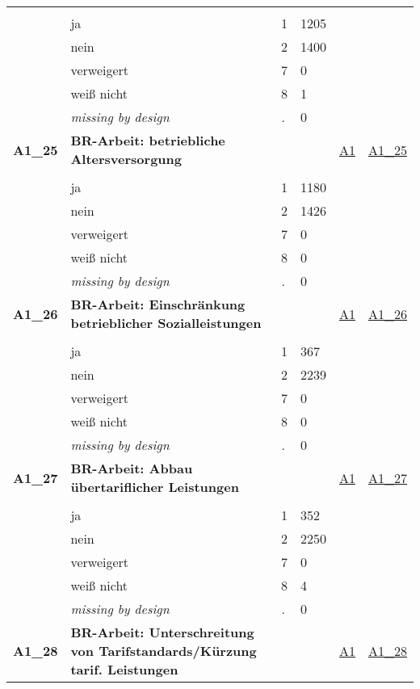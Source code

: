 \begin{longtable}{| L{2.45cm} | L{6cm} | C{1.5cm} | R{1cm} | C{2.25cm} | C{2.25cm} |}
   &  &  &  &  &  \\ 
   & ja & 1 & 1205 &  &  \\ 
   & nein & 2 & 1400 &  &  \\ 
   & verweigert & 7 & 0 &  &  \\ 
   & weiß nicht & 8 & 1 &  &  \\ 
   & \textit{missing by design} & \textit{.} & 0 &  &  \\ 
   \midrule
\textbf{A1\_25}\label{var:A1:25} & \textbf{BR-Arbeit: betriebliche Altersversorgung} &  &  & \hyperref[A1]{A1} & \hyperref[var:suf:A1:25]{A1\_25} \\ 
   &  &  &  &  &  \\ 
   & ja & 1 & 1180 &  &  \\ 
   & nein & 2 & 1426 &  &  \\ 
   & verweigert & 7 & 0 &  &  \\ 
   & weiß nicht & 8 & 0 &  &  \\ 
   & \textit{missing by design} & \textit{.} & 0 &  &  \\ 
   \midrule
\textbf{A1\_26}\label{var:A1:26} & \textbf{BR-Arbeit: Einschränkung betrieblicher Sozialleistungen} &  &  & \hyperref[A1]{A1} & \hyperref[var:suf:A1:26]{A1\_26} \\ 
   &  &  &  &  &  \\ 
   & ja & 1 & 367 &  &  \\ 
   & nein & 2 & 2239 &  &  \\ 
   & verweigert & 7 & 0 &  &  \\ 
   & weiß nicht & 8 & 0 &  &  \\ 
   & \textit{missing by design} & \textit{.} & 0 &  &  \\ 
   \midrule
\textbf{A1\_27}\label{var:A1:27} & \textbf{BR-Arbeit: Abbau übertariflicher Leistungen} &  &  & \hyperref[A1]{A1} & \hyperref[var:suf:A1:27]{A1\_27} \\ 
   &  &  &  &  &  \\ 
   & ja & 1 & 352 &  &  \\ 
   & nein & 2 & 2250 &  &  \\ 
   & verweigert & 7 & 0 &  &  \\ 
   & weiß nicht & 8 & 4 &  &  \\ 
   & \textit{missing by design} & \textit{.} & 0 &  &  \\ 
   \midrule
\textbf{A1\_28}\label{var:A1:28} & \textbf{BR-Arbeit: Unterschreitung von Tarifstandards/Kürzung tarif. Leistungen} &  &  & \hyperref[A1]{A1} & \hyperref[var:suf:A1:28]{A1\_28} \\ 

\end{longtable}
